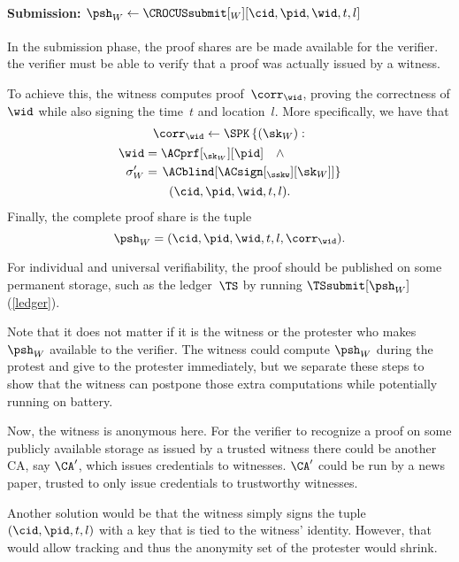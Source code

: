 \paragraph*{Submission:
  \(\psh_W\gets \CROCUSsubmit[_W][\cid, \pid, \wid, t, l]\)}

In the submission phase, the proof shares are be made available for the 
verifier.
\Ie the verifier must be able to verify that a proof was actually issued by a 
witness.

To achieve this, the witness computes  proof~\(\corr_{\wid}\), 
proving the correctness of \(\wid\) while also signing the time~\(t\) and 
location~\(l\).
More specifically, we have that
\begin{multline*}
  \corr_{\wid}\gets \SPK\left\{ (\sk_W) : \right. \\
    \begin{aligned}
      \wid &= \ACprf[_{\sk_W}][\pid] \quad \land \\
      \sigma_W' &= \left. \ACblind[\ACsign[_{\sskw}][\sk_W]] \right\}
    \end{aligned} \\
      (\cid, \pid, \wid, t, l).
\end{multline*}
Finally, the complete proof share is the tuple \[
  \psh_W = (\cid, \pid, \wid, t, l, \corr_{\wid}).
\]

For individual and universal verifiability, the proof should be published on 
some permanent storage, such as the ledger~\(\TS\) by running 
\(\TSsubmit[\psh_W]\) (\cref{ledger}).

Note that it does not matter if it is the witness or the protester who makes 
\(\psh_W\) available to the verifier.
The witness could compute \(\psh_W\) during the protest and give to the 
protester immediately, but we separate these steps to show that the witness can 
postpone those extra computations while potentially running on battery.

Now, the witness is anonymous here.
For the verifier to recognize a proof on some publicly available storage as 
issued by a trusted witness there could be another \ac{CA}, say \(\CA'\), which 
issues credentials to witnesses.
\(\CA'\) could be run by a news paper, trusted to only issue credentials to 
trustworthy witnesses.

Another solution would be that the witness simply signs the tuple \((\cid, 
\pid, t, l)\) with a key that is tied to the witness' identity.
However, that would allow tracking and thus the anonymity set of the protester 
would shrink.

